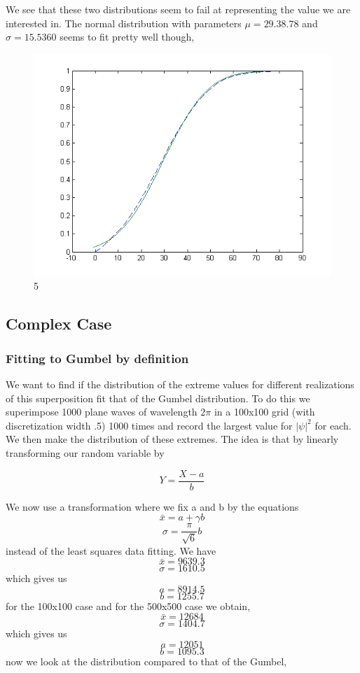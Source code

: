 \documentclass[12pt]{article}
\begin{document}
We see that these two distributions seem to fail at representing the value we are interested in. The normal distribution with parameters $\mu = 29.38.78$ and $\sigma = 15.5360$ seems to fit pretty well though,

\begin{figure}[hpt]
	\centering
		\includegraphics[width=1.00\textwidth]{pnR_512_bot10diff_normal.png}
	\caption{5}
	\label{fig:pnR_512_bot10diff_normal}
\end{figure}

\subsection{Complex Case}

\subsubsection{Fitting to Gumbel by definition}
We want to find if the distribution of the extreme values for different realizations of this superposition fit that of the Gumbel distribution. To do this we superimpose 1000 plane waves of wavelength $2 \pi$ in a 100x100 grid (with discretization width .5) 1000 times and record the largest value for $|\psi|^{2}$ for each. We then make the distribution of these extremes. The idea is that by linearly transforming our random variable by

\[Y = \frac{X - a}{b}\]

We now use a transformation where we fix a and b by the equations
\[\bar{x} = a + \gamma b\]
\[\sigma = \frac{\pi}{\sqrt{6}} b\]
instead of the least squares data fitting. We have
\[\bar{x} = 9639.3\]
\[\sigma = 1610.5\]
which gives us
\[a = 8914.5\]
\[b = 1255.7\]
for the 100x100 case and for the 500x500 case we obtain,
\[\bar{x} = 12684\]
\[\sigma = 1404.7\]
which gives us
\[a = 12051\]
\[b = 1095.3\]
now we look at the distribution compared to that of the Gumbel,
\end{document}
